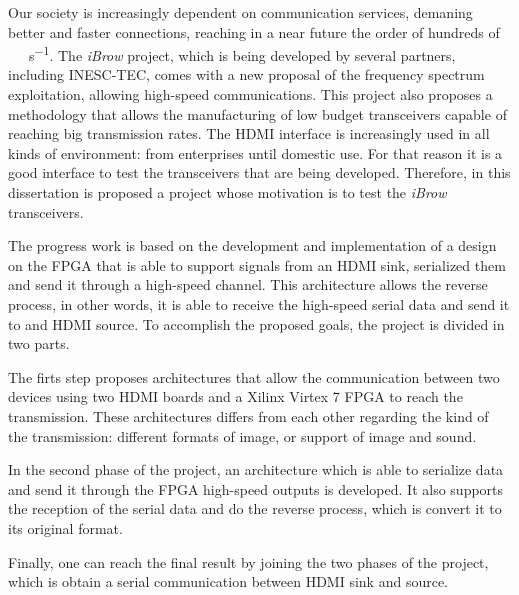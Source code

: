 Our society is increasingly dependent on communication services, demaning better and faster connections, reaching in a near future the order of hundreds of \SI{}{\giga\bit\per\second}. The \textit{iBrow} project, which is being developed by several partners, including INESC-TEC, comes with a new proposal of the frequency spectrum exploitation, allowing high-speed communications. This project also proposes a methodology that allows the manufacturing of low budget transceivers capable of reaching big transmission rates. The HDMI interface is increasingly used in all kinds of environment: from enterprises until domestic use. For that reason it is a good interface to test the transceivers that are being developed. Therefore, in this dissertation is proposed a project whose motivation is to test the \textit{iBrow} transceivers.

The progress work is based on the development and implementation of a design on the FPGA that is able to support signals from an HDMI sink, serialized them and send it through a high-speed channel. This architecture allows the reverse process, in other words, it is able to receive the high-speed serial data and send it to and HDMI source. To accomplish the proposed goals, the project is divided in two parts.

The firts step proposes architectures that allow the communication between two devices using two HDMI boards and a Xilinx Virtex 7 FPGA to reach the transmission. These architectures differs from each other regarding the kind of the transmission: different formats of image, or support of image and sound.

In the second phase of the project, an architecture which is able to serialize data and send it through the FPGA high-speed outputs is developed. It also supports the reception of the serial data and do the reverse process, which is convert it to its original format.

Finally, one can reach the final result by joining the two phases of the project, which is obtain a serial communication between HDMI sink and source.


